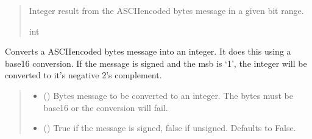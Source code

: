 \documentclass[letterpaper,10pt,english]{sphinxmanual}
\begin{document}
\begin{fulllineitems}
\begin{fulllineitems}
\begin{quote}
\begin{description}
\sphinxAtStartPar
Integer result from the ASCII\sphinxhyphen{}encoded bytes message in a given bit range.

\sphinxAtStartPar
int

\end{description}\end{quote}

\end{fulllineitems}


\begin{fulllineitems}
\label{\detokenize{PodPacketHandling:PodPacketHandling.POD_Packets.AsciiBytesToInt}}
\pysigstartsignatures
{}
\pysigstopsignatures
\sphinxAtStartPar
Converts a ASCII\sphinxhyphen{}encoded bytes message into an integer.  It does this using a base\sphinxhyphen{}16         conversion. If the message is signed and the msb is ‘1’, the integer will be converted to         it’s negative 2’s complement.
\begin{quote}\begin{description}
\begin{itemize}
\item {} 
\sphinxAtStartPar
{} () \textendash{} Bytes message to be converted to an integer. The bytes must be base\sphinxhyphen{}16 or                 the conversion will fail.

\item {} 
\sphinxAtStartPar
{} (\sphinxstyleliteralemphasis{\sphinxupquote{, }}) \textendash{} True if the message is signed, false if unsigned. Defaults to False.

\end{itemize}


\end{description}
\end{quote}
\end{fulllineitems}
\end{fulllineitems}
\end{document}
